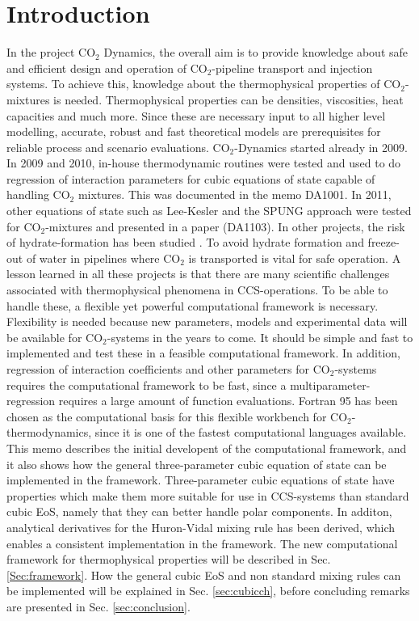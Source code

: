 \documentclass[a4paper, 12pt, english, sintefheadings, sintefcolour]{sintefmemo}
\begin{document}
\section{Introduction}
In the project CO$_2$ Dynamics, the overall aim is to provide knowledge about
safe and efficient design and operation of CO$_2$-pipeline transport and
injection systems. To achieve this, knowledge about the thermophysical
properties of CO$_2$-mixtures is needed. Thermophysical properties can be
densities, viscosities, heat capacities and much more. Since these are
necessary input to all higher level modelling, accurate, robust and fast
theoretical models are prerequisites for reliable process and scenario
evaluations. CO$_2$-Dynamics started already in 2009. In 2009 and 2010,
in-house thermodynamic routines were tested and used to do regression of
interaction parameters for cubic equations of state capable of handling CO$_2$
mixtures. This was documented in the memo DA1001. In 2011, other equations of
state such as Lee-Kesler and the SPUNG approach were tested for
CO$_2$-mixtures and presented in a paper (DA1103). In other projects, the risk
of hydrate-formation has been studied \cite{Gelein2011}. To avoid hydrate
formation and freeze-out of water in pipelines where CO$_2$ is transported is
vital for safe operation. A lesson learned in all these projects is that there
are many scientific challenges associated with thermophysical phenomena in
CCS-operations. To be able to handle these, a flexible yet powerful
computational framework is necessary. Flexibility is needed because new
parameters, models and experimental data will be available for CO$_2$-systems
in the years to come. It should be simple and fast to implemented and test
these in a feasible computational framework. In addition, regression of
interaction coefficients and other parameters for CO$_2$-systems requires the
computational framework to be fast, since a multiparameter-regression requires
a large amount of function evaluations. Fortran 95 has been chosen as the
computational basis for this flexible workbench for CO$_2$-thermodynamics,
since it is one of the fastest computational languages available. This memo
describes the initial developent of the computational framework, and it also
shows how the general three-parameter cubic equation of state can be
implemented in the framework. Three-parameter cubic equations of state have
properties which make them more suitable for use in CCS-systems than standard
cubic EoS, namely that they can better handle polar components. In additon,
analytical derivatives for the Huron-Vidal mixing rule has been derived, which
enables a consistent implementation in the framework. The new computational
framework for thermophysical properties will be described in
Sec. \ref{Sec:framework}. How the general cubic EoS and non standard mixing
rules can be implemented will be explained in Sec. \ref{sec:cubicch}, before
concluding remarks are presented in Sec. \ref{sec:conclusion}.
\end{document}
